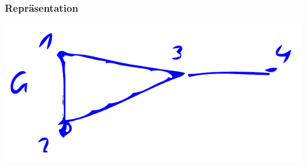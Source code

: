 \documentclass{scrartcl}
\begin{document}
\subsubsection{Repräsentation}

\includegraphics[width=\textwidth]{figures/graph.pdf}
\end{document}
